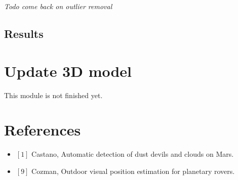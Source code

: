 \documentclass[10pt]{article}
\begin{document}
\textit{Todo come back on outlier removal}
\subsection{Results}

\section{Update 3D model}
This module is not finished yet.


\section{References}
\begin{itemize}
\item $[1]$ Castano, Automatic detection of dust devils and clouds on Mars.
\item $[9]$ Cozman, Outdoor visual position estimation for planetary rovers.
\end{itemize}
\end{document}
